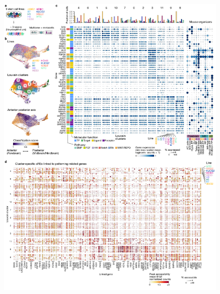 \begin{figure}[h!]
    \centering
	\includegraphics[width=\textwidth]{figures/pando/Figure_S3}
    \label{fig:regS3}
\end{figure}

